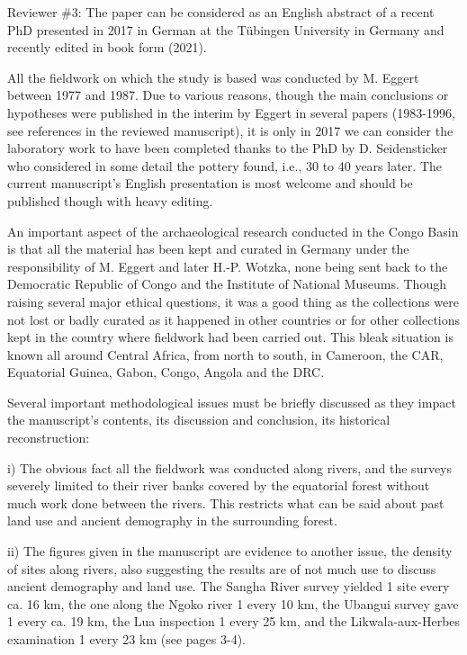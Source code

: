 \begin{reviewer}
\end{reviewer}
	
\begin{reviewer}

Reviewer \#3: The paper can be considered as an English abstract of a recent PhD presented in 2017 in German at the Tübingen University in Germany and recently edited in book form (2021).

All the fieldwork on which the study is based was conducted by M. Eggert between 1977 and 1987. Due to various reasons, though the main conclusions or hypotheses were published in the interim by Eggert in several papers (1983-1996, see references in the reviewed manuscript), it is only in 2017 we can consider the laboratory work to have been completed thanks to the PhD by D. Seidensticker who considered in some detail the pottery found, i.e., 30 to 40 years later. The current manuscript's English presentation is most welcome and should be published though with heavy editing.

An important aspect of the archaeological research conducted in the Congo Basin is that all the material has been kept and curated in Germany under the responsibility of M. Eggert and later H.-P. Wotzka, none being sent back to the Democratic Republic of Congo and the Institute of National Museums. Though raising several major ethical questions, it was a good thing as the collections were not lost or badly curated as it happened in other countries or for other collections kept in the country where fieldwork had been carried out. This bleak situation is known all around Central Africa, from north to south, in Cameroon, the CAR, Equatorial Guinea, Gabon, Congo, Angola and the DRC.

Several important methodological issues must be briefly discussed as they impact the manuscript's contents, its discussion and conclusion, its historical reconstruction:

i) The obvious fact all the fieldwork was conducted along rivers, and the surveys severely limited to their river banks covered by the equatorial forest without much work done between the rivers. This restricts what can be said about past land use and ancient demography in the surrounding forest.

ii) The figures given in the manuscript are evidence to another issue, the density of sites along rivers, also suggesting the results are of not much use to discuss ancient demography and land use. The Sangha River survey yielded 1 site every ca. 16 km, the one along the Ngoko river 1 every 10 km, the Ubangui survey gave 1 every ca. 19 km, the Lua inspection 1 every 25 km, and the Likwala-aux-Herbes examination 1 every 23 km (see pages 3-4).


\end{reviewer}
